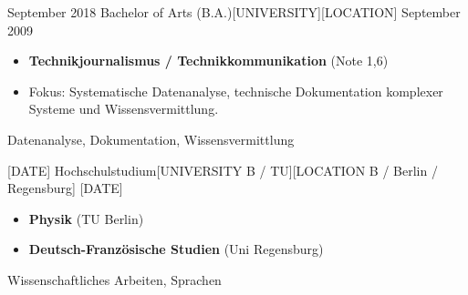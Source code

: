 %
%
%
\begin{experiences}

\experience
    {September 2018}   {Bachelor of Arts (B.A.)}{[UNIVERSITY]}{[LOCATION]}
    {September 2009} {
                      \begin{itemize}
                        \item \textbf{Technikjournalismus / Technikkommunikation} (Note 1,6)
                        \item Fokus: Systematische Datenanalyse, technische Dokumentation komplexer Systeme und Wissensvermittlung.
                      \end{itemize}
                      }
                    {Datenanalyse, Dokumentation, Wissensvermittlung}
  \emptySeparator

  \experience
    {[DATE]}   {Hochschulstudium}{[UNIVERSITY B / TU]}{[LOCATION B / Berlin / Regensburg]}
    {[DATE]} {
                      \begin{itemize}
                        \item \textbf{Physik} (TU Berlin)
                        \item \textbf{Deutsch-Französische Studien} (Uni Regensburg)
                      \end{itemize}
                    }
                    {Wissenschaftliches Arbeiten, Sprachen}

\end{experiences}
